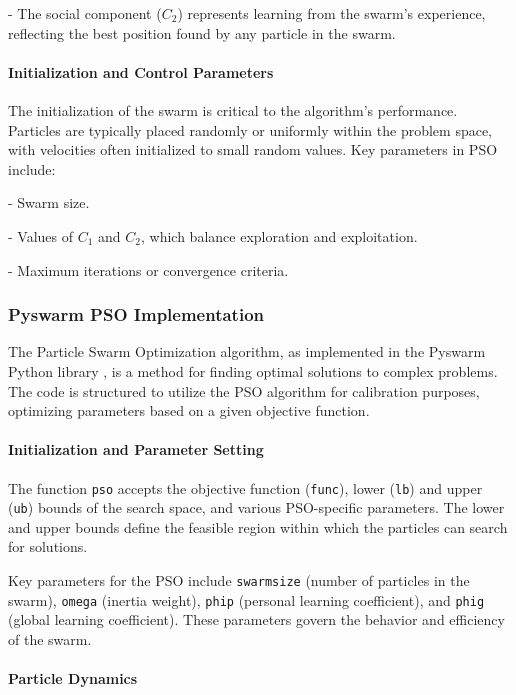 \documentclass{report}
\begin{document}
- The social component (\(C_2\)) represents learning from the swarm’s experience, reflecting the best position found by any particle in the swarm.

\paragraph{Initialization and Control Parameters}
The initialization of the swarm is critical to the algorithm’s performance. Particles are typically placed randomly or uniformly within the problem space, with velocities often initialized to small random values. Key parameters in PSO include:

- Swarm size.

- Values of \(C_1\) and \(C_2\), which balance exploration and exploitation.

- Maximum iterations or convergence criteria.

\subsubsection{Pyswarm PSO Implementation}

The Particle Swarm Optimization algorithm, as implemented in the Pyswarm Python library \cite{pyswarmPSO}, is a method for finding optimal solutions to complex problems. The code is structured to utilize the PSO algorithm for calibration purposes, optimizing parameters based on a given objective function.

\paragraph{Initialization and Parameter Setting}

The function \texttt{pso} accepts the objective function (\texttt{func}), lower (\texttt{lb}) and upper (\texttt{ub}) bounds of the search space, and various PSO-specific parameters. The lower and upper bounds define the feasible region within which the particles can search for solutions.

Key parameters for the PSO include \texttt{swarmsize} (number of particles in the swarm), \texttt{omega} (inertia weight), \texttt{phip} (personal learning coefficient), and \texttt{phig} (global learning coefficient). These parameters govern the behavior and efficiency of the swarm.

\paragraph{Particle Dynamics}
\end{document}
